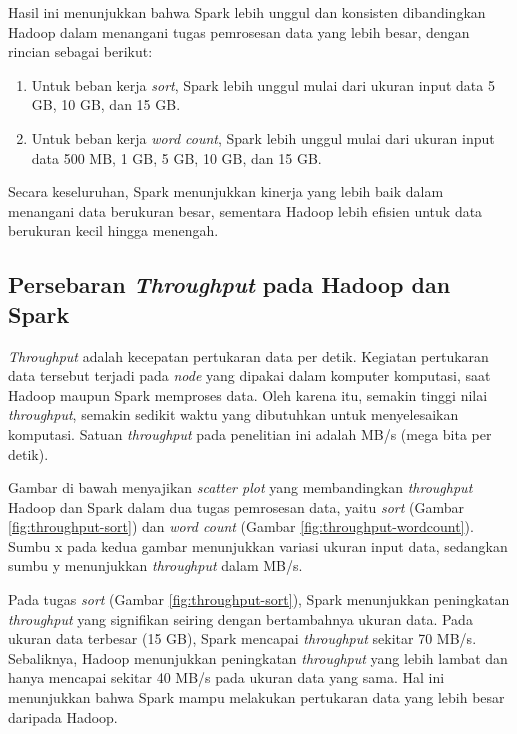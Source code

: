 Hasil ini menunjukkan bahwa Spark lebih unggul dan konsisten dibandingkan Hadoop dalam menangani tugas pemrosesan data yang lebih besar, dengan rincian sebagai berikut:
\begin{enumerate}
\item Untuk beban kerja \textit{sort}, Spark lebih unggul mulai dari ukuran input data 5 GB, 10 GB, dan 15 GB.
\item Untuk beban kerja \textit{word count}, Spark lebih unggul mulai dari ukuran input data 500 MB, 1 GB, 5 GB, 10 GB, dan 15 GB.
\end{enumerate}

Secara keseluruhan, Spark menunjukkan kinerja yang lebih baik dalam menangani data berukuran besar, sementara Hadoop lebih efisien untuk data berukuran kecil hingga menengah.

\subsection {Persebaran \textit{Throughput} pada Hadoop dan Spark}

\textit{Throughput} adalah kecepatan pertukaran data per detik. Kegiatan pertukaran data tersebut terjadi pada \textit{node} yang dipakai dalam komputer komputasi, saat Hadoop maupun Spark memproses data. Oleh karena itu, semakin tinggi nilai \textit{throughput}, semakin sedikit waktu yang dibutuhkan untuk menyelesaikan komputasi. Satuan \textit{throughput} pada penelitian ini adalah MB/s (mega bita per detik).

Gambar di bawah menyajikan \textit{scatter plot} yang membandingkan \textit{throughput} Hadoop dan Spark dalam dua tugas pemrosesan data, yaitu \textit{sort} (Gambar \ref{fig:throughput-sort}) dan \textit{word count} (Gambar \ref{fig:throughput-wordcount}). Sumbu x pada kedua gambar menunjukkan variasi ukuran input data, sedangkan sumbu y menunjukkan \textit{throughput} dalam MB/s.

Pada tugas \textit{sort} (Gambar \ref{fig:throughput-sort}), Spark menunjukkan peningkatan \textit{throughput} yang signifikan seiring dengan bertambahnya ukuran data. Pada ukuran data terbesar (15 GB), Spark mencapai \textit{throughput} sekitar 70 MB/s. Sebaliknya, Hadoop menunjukkan peningkatan \textit{throughput} yang lebih lambat dan hanya mencapai sekitar 40 MB/s pada ukuran data yang sama. Hal ini menunjukkan bahwa Spark mampu melakukan pertukaran data yang lebih besar daripada Hadoop.

